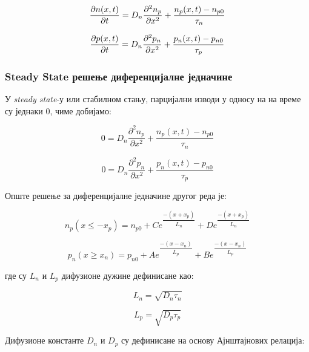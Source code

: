 \documentclass{article}
\begin{document}
\begin{equation*}
	\pdv{n(x,t)}{t}  = D_n \frac{\partial^2 n_p}{\partial x^2}   + \dfrac{n_p(x,t) - n_{p0}}{\tau_n}
\end{equation*}

\begin{equation*}
	\pdv{p(x,t)}{t}  = D_n \frac{\partial^2 p_n}{\partial x^2}   + \dfrac{p_n(x,t) - p_{n0}}{\tau_p}
\end{equation*} %


\subsubsection{Steady State решење диференцијалне једначине}

У \textit{steady state}-у или стабилном стању, парцијални изводи у односу на на време су једнаки 0, чиме добијамо:

\begin{equation*}
	0 = D_n \frac{\partial^2 n_p}{\partial x^2}   + \dfrac{n_p(x,t) - n_{p0}}{\tau_n}
\end{equation*}

\begin{equation*}
	0  = D_n \frac{\partial^2 p_n}{\partial x^2}   + \dfrac{p_n(x,t) - p_{n0}}{\tau_p}
\end{equation*}

Опште решење за диференцијалне једначине другог реда је:

\begin{equation*}
	n_p (x \le -x_p) = n_{p0} + C e^{\dfrac{-(x+x_p)}{L_n}} + D e^{\dfrac{-(x+x_p)}{L_n}}
\end{equation*}

\begin{equation*}
	p_n (x \ge x_n) = p_{n0} + A e^{\dfrac{-(x-x_n)}{L_p}} + B e^{\dfrac{-(x-x_n)}{L_p}}
\end{equation*}

где су $L_n$ и $L_p$ дифузионе дужине дефинисане као: 

\begin{equation*}
	L_n = \sqrt{D_n \tau_n}
\end{equation*}

\begin{equation*}
	L_p = \sqrt{D_p \tau_p}
\end{equation*}

Дифузионе константе $D_n$ и $D_p$ су дефинисане на основу Ајнштајнових релација:
\end{document}
